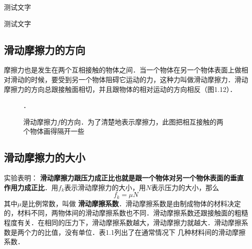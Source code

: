 \begin{Point*}
	测试文字
\end{Point*}

\begin{Case*}
	\item 测试文字
\end{Case*}


\subsection{滑动摩擦力的方向}
摩擦力也是发生在两个互相接触的物体之间．当一个物体在另一个物体表面上做相对滑动的时候，要受到另一个物体阻碍它运动的力，这种力叫做滑动摩擦力．滑动摩擦力的方向总跟接触面相切，并且跟物体的相对运动的方向相反（图1.12）．
\begin{figure}[H]
    \centering
    \caption{滑动摩擦力$f$的方向．为了清楚地表示摩擦力，此图把相互接触的两个物体画得隔开一些}．
\end{figure}


\subsection{滑动摩擦力的大小}
实验表明：\textbf{ 滑动摩擦力跟压力成正比也就是跟一个物体对另一个物休表面的垂直作用力成正比}．用$f_k$表示滑动摩擦力的大小，用$N$表示压力的大小，那么
\begin{equation}
    f_k=\mu N
\end{equation}
其中$\mu$是比例常数，叫做\textbf{ 滑动摩擦系数}．滑动摩擦系数是由制成物体的材料决定的，材料不同，两物体间的滑动摩擦系数也不同．滑动摩擦系数还跟接触面的粗糙程度有关．在相同的压力下，滑动摩擦系数越大，滑动摩擦力就越大．滑动摩擦系数是两个力的比值，没有单位．表1.1列出了在通常情况下
几种材料间的滑动摩擦系数．

